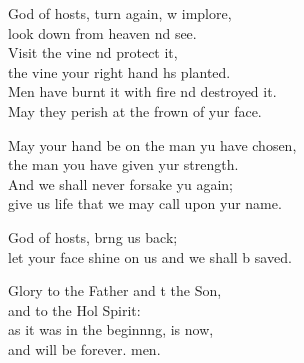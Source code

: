 \begin{psalmverse}
\begin{patverse}
God of hosts, turn again, w implore,\Med\\
look down from heaven nd see.\\
Visit the vine nd protect it,\Med\\
the vine your right hand hs planted.\\
Men have burnt it with fire nd destroyed it.\Med\\
May they perish at the frown of yur face.

May your hand be on the man yu have chosen,\Med\\
the man you have given yur strength.\\
And we shall never forsake yu again;\Med\\
give us life that we may call upon yur name.

God of hosts, br\pointup{\i}ng us back;\Med\\
let your face shine on us and we shall b saved.

Glory to the Father and t the Son,\Med\\
and to the Hol Spirit:\\
as it was in the beginn\pointup{\i}ng, is now,\Med\\
and will be forever. men.
  \end{patverse}
\end{psalmverse}
